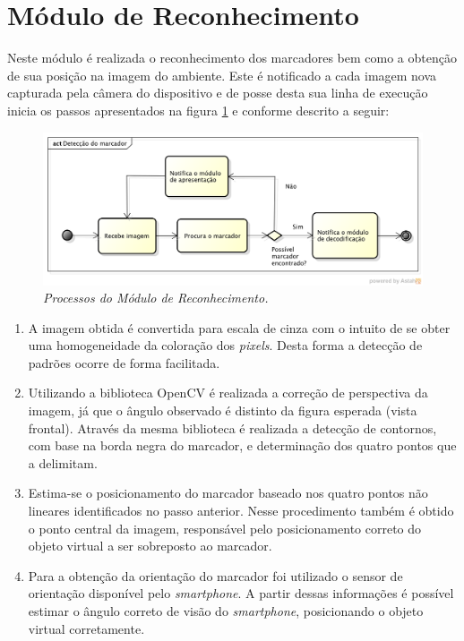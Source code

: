 \section{Módulo de Reconhecimento}
\label{sec:modulo_reconhecimento}

	
	Neste módulo é realizada o reconhecimento dos marcadores bem como a obtenção de sua posição na
	imagem do ambiente. Este é notificado a cada imagem nova capturada pela câmera do dispositivo e de
	posse desta sua linha de execução inicia os passos apresentados na figura \ref{fig:processo_detect} e
	conforme descrito a seguir:
	
	\begin{figure}[h]
		\centering \includegraphics[scale=0.55]{figuras/cap4/processo_deteccao.png}
		\caption{\textit{Processos do Módulo de Reconhecimento.}}
		\label{fig:processo_detect} 
	\end{figure}
	
	\begin{enumerate}

	  \item A imagem obtida é convertida para escala de cinza com o intuito de se obter uma 
	  	homogeneidade da coloração dos \textit{pixels}. Desta forma a detecção de padrões ocorre de forma 
	  	facilitada.
	  
	  \item Utilizando a biblioteca OpenCV é realizada a correção de perspectiva da imagem, já que 
	  	o ângulo observado é distinto da figura esperada (vista frontal). Através da mesma biblioteca 
	  	é realizada a detecção de contornos, com base na borda negra do marcador, e determinação dos 
	  	quatro pontos que a delimitam.
	  	
	  \item Estima-se o posicionamento do marcador baseado nos quatro pontos não lineares
	  		identificados no passo anterior. Nesse procedimento também é obtido o ponto central da imagem,
	  		responsável pelo posicionamento correto do objeto virtual a ser sobreposto ao marcador.
	  
	  \item Para a obtenção da orientação do marcador foi utilizado o sensor de orientação disponível pelo
	  		\textit{smartphone}. A partir dessas informações é possível estimar o ângulo correto de visão
	  		do \textit{smartphone}, posicionando o objeto virtual corretamente.
	  		
	\end{enumerate} 
	
